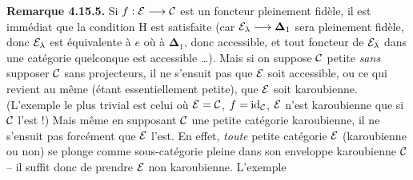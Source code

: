 \textbf{Remarque 4.15.5.} Si $f : \mathcal{E} \longrightarrow \mathcal{C}$ est un foncteur pleinement fidèle, il est immédiat que la condition H est satisfaite (car $\mathcal{E}_{\lambda} \longrightarrow \mathbf{\Delta}_1$ sera pleinement fidèle, donc $\mathcal{E}_{\lambda}$ est équivalente
à $e$ où à $\mathbf{\Delta}_1$, donc accessible, et tout foncteur de $\mathcal{E}_{\lambda}$ dans une catégorie quelconque est %
accessible \dots). Mais si on suppose $\mathcal{C}$ petite \textit{sans} supposer $\mathcal{C}$ sans projecteurs, il ne s'ensuit pas que $\mathcal{E}$ soit accessible, ou ce qui revient au même (étant essentiellement petite), que $\mathcal{E}$ soit karoubienne. (L'exemple le plus trivial est celui où $\mathcal{E} = \mathcal{C}$, $f = \mathrm{id}_{\mathcal{C}}$, $\mathcal{E}$ n'est karoubienne que si $\mathcal{C}$ l'est !) Mais même en supposant $\mathcal{C}$ une petite catégorie karoubienne, il ne s'ensuit pas forcément que $\mathcal{E}$ l'est. En effet, \textit{toute} petite catégorie $\mathcal{E}$ (karoubienne ou non) se plonge comme sous-catégorie pleine dans son enveloppe karoubienne $\mathcal{C}$ -- il suffit donc de prendre $\mathcal{E}$ non karoubienne. L'exemple


